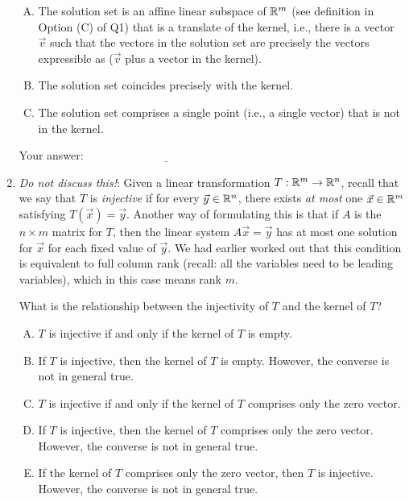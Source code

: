 \documentclass[10pt]{amsart}
\begin{document}
\begin{enumerate}
  \begin{enumerate}[(A)]
  \item The solution set is an affine linear subspace of $\mathbb{R}^m$ (see
    definition in Option (C) of Q1) that is a translate of the kernel,
    i.e., there is a vector $\vec{v}$ such that the vectors in the
    solution set are precisely the vectors expressible as ($\vec{v}$
    plus a vector in the kernel).
  \item The solution set coincides precisely with the kernel.
  \item The solution set comprises a single point (i.e., a single
    vector) that is not in the kernel.
  \end{enumerate}

  \vspace{0.1in}
  Your answer: $\underline{\qquad\qquad\qquad\qquad\qquad\qquad\qquad}$
  \vspace{0.1in}

\item {\em Do not discuss this!}: Given a linear transformation
  $T:\mathbb{R}^m \to \mathbb{R}^n$, recall that we say that $T$ is {\em injective} if
  for every $\vec{y} \in \mathbb{R}^n$, there exists {\em at most} one
  $\vec{x} \in \mathbb{R}^m$ satisfying $T(\vec{x}) = \vec{y}$. Another way of
  formulating this is that if $A$ is the $n \times m$ matrix for $T$,
  then the linear system $A\vec{x} = \vec{y}$ has at most one solution
  for $\vec{x}$ for each fixed value of $\vec{y}$. We had earlier
  worked out that this condition is equivalent to full column rank
  (recall: all the variables need to be leading variables), which in
  this case means rank $m$.

  What is the relationship between the injectivity of $T$ and the
  kernel of $T$?

  \begin{enumerate}[(A)]
  \item $T$ is injective if and only if the kernel of $T$ is empty.
  \item If $T$ is injective, then the kernel of $T$ is empty. However,
    the converse is not in general true.
  \item $T$ is injective if and only if the kernel of $T$ comprises
    only the zero vector.
  \item If $T$ is injective, then the kernel of $T$ comprises only the
    zero vector. However, the converse is not in general true.
  \item If the kernel of $T$ comprises only the zero vector, then $T$
    is injective. However, the converse is not in general true.
  \end{enumerate}


\end{enumerate}
\end{document}
